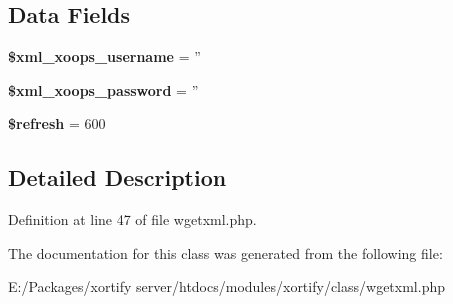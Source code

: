 \subsection*{Data Fields}
\begin{DoxyCompactItemize}
\item 
\hypertarget{class_w_g_e_t_x_m_l_xortify_exchange_a725df0dd6b578e15522ed15945e5901c}{{\bfseries \$xml\-\_\-xoops\-\_\-username} = ''}\label{class_w_g_e_t_x_m_l_xortify_exchange_a725df0dd6b578e15522ed15945e5901c}

\item 
\hypertarget{class_w_g_e_t_x_m_l_xortify_exchange_a8ec2889165c837354fded1cedbd42157}{{\bfseries \$xml\-\_\-xoops\-\_\-password} = ''}\label{class_w_g_e_t_x_m_l_xortify_exchange_a8ec2889165c837354fded1cedbd42157}

\item 
\hypertarget{class_w_g_e_t_x_m_l_xortify_exchange_a8527f826b6959aaa92b0e51ee427ba1a}{{\bfseries \$refresh} = 600}\label{class_w_g_e_t_x_m_l_xortify_exchange_a8527f826b6959aaa92b0e51ee427ba1a}

\end{DoxyCompactItemize}


\subsection{Detailed Description}


Definition at line 47 of file wgetxml.\-php.



The documentation for this class was generated from the following file\-:\begin{DoxyCompactItemize}
\item 
E\-:/\-Packages/xortify server/htdocs/modules/xortify/class/wgetxml.\-php\end{DoxyCompactItemize}
